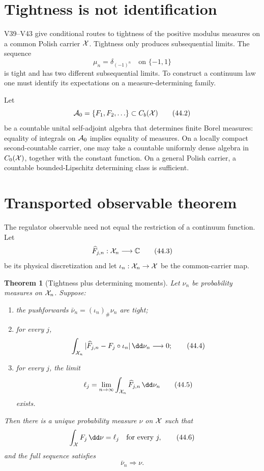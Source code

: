 \documentclass[11pt]{article}
\newtheorem{theorem}{Theorem}[section]
\theoremstyle{remark}
\begin{document}
\section{Tightness is not identification}

V39--V43 give conditional routes to tightness of the positive
modulus measures on a common Polish carrier \({\cal X}\).  Tightness
only produces subsequential limits.  The sequence
\[
 \mu_n=\delta_{(-1)^n}\quad\text{on }\{-1,1\}             \tag{44.1}
\]
is tight and has two different subsequential limits.  To construct a
continuum law one must identify its expectations on a
measure-determining family.

Let
\[
 {\cal A}_0=\{F_1,F_2,\ldots\}\subset C_b({\cal X})       \tag{44.2}
\]
be a countable unital self-adjoint algebra that determines finite
Borel measures: equality of integrals on \({\cal A}_0\) implies
equality of measures.  On a locally compact second-countable carrier,
one may take a countable uniformly dense algebra in
\(C_0({\cal X})\), together with the constant function.  On a
general Polish carrier, a countable bounded-Lipschitz determining
class is sufficient.

\section{Transported observable theorem}

The regulator observable need not equal the restriction of a
continuum function.  Let
\[
 \widehat F_{j,n}:{\cal X}_n\longrightarrow\mathbb C     \tag{44.3}
\]
be its physical discretization and let
\(\iota_n:{\cal X}_n\to{\cal X}\) be the common-carrier map.

\begin{theorem}[Tightness plus determining moments]
\label{thm:v15v44-identification}
Let \(\nu_n\) be probability measures on \({\cal X}_n\).  Suppose:
\begin{enumerate}
\item the pushforwards
      \(\bar\nu_n=(\iota_n)_\#\nu_n\) are tight;
\item for every \(j\),
      \[
       \int_{{\cal X}_n}
       |\widehat F_{j,n}-F_j\circ\iota_n|\,\dd\nu_n
       \longrightarrow0;                                \tag{44.4}
      \]
\item for every \(j\), the limit
      \[
       \ell_j=\lim_{n\to\infty}
       \int_{{\cal X}_n}\widehat F_{j,n}\,\dd\nu_n       \tag{44.5}
      \]
      exists.
\end{enumerate}
Then there is a unique probability measure \(\nu\) on \({\cal X}\)
such that
\[
 \int_{\cal X}F_j\,\dd\nu=\ell_j
 \quad\text{for every }j,                               \tag{44.6}
\]
and the full sequence satisfies
\[
 \boxed{\bar\nu_n\Longrightarrow\nu.}                   \tag{44.7}
\]
\end{theorem}
\end{document}
